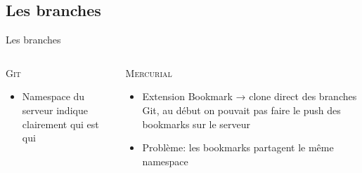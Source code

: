 \subsection{Les branches}
\begin{frame}{Les branches}
  \begin{columns}[T]

    \begin{column}{.5\textwidth}
      \textsc{Git}

      \begin{itemize}
        \item{Namespace du serveur indique clairement qui est qui}
      \end{itemize}
    \end{column}

    \begin{column}{.5\textwidth}
      \textsc{Mercurial}

      \begin{itemize}
        \item{Extension Bookmark → clone direct des branches Git, au début on
              pouvait pas faire le push des bookmarks sur le serveur}
        \item{Problème: les bookmarks partagent le même namespace}
      \end{itemize}
    \end{column}

  \end{columns}
\end{frame}

